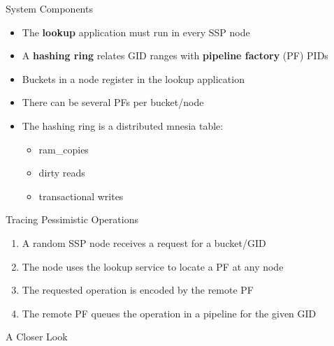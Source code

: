 \documentclass[aspectratio=169]{beamer}
\begin{document}
\begin{frame}{System Components}
    \begin{itemize}
        \item The \textbf{lookup} application must run in every SSP node
        \item A \textbf{hashing ring} relates GID ranges with \textbf{pipeline factory} (PF) PIDs
        \item Buckets in a node register in the lookup application
        \item There can be several PFs per bucket/node
        \item The hashing ring is a distributed mnesia table:
            \begin{itemize}
                \item ram\_copies
                \item dirty reads
                \item transactional writes
            \end{itemize}
    \end{itemize}
\end{frame}

\begin{frame}{Tracing Pessimistic Operations}
    \begin{enumerate}
        \item A random SSP node receives a request for a bucket/GID
        \item The node uses the lookup service to locate a PF at any node
        \item The requested operation is encoded by the remote PF
        \item The remote PF queues the operation in a pipeline for the given GID
    \end{enumerate}
\end{frame}

\begin{frame}{A Closer Look}
\end{frame}
\end{document}

